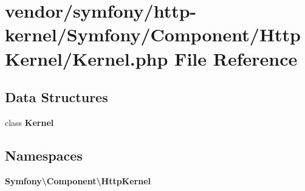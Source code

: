 \section{vendor/symfony/http-\/kernel/\+Symfony/\+Component/\+Http\+Kernel/\+Kernel.php File Reference}
\label{vendor_2symfony_2http-kernel_2_symfony_2_component_2_http_kernel_2_kernel_8php}
\subsection*{Data Structures}
\begin{DoxyCompactItemize}
\item 
class {\bf Kernel}
\end{DoxyCompactItemize}
\subsection*{Namespaces}
\begin{DoxyCompactItemize}
\item 
 {\bf Symfony\textbackslash{}\+Component\textbackslash{}\+Http\+Kernel}
\end{DoxyCompactItemize}
